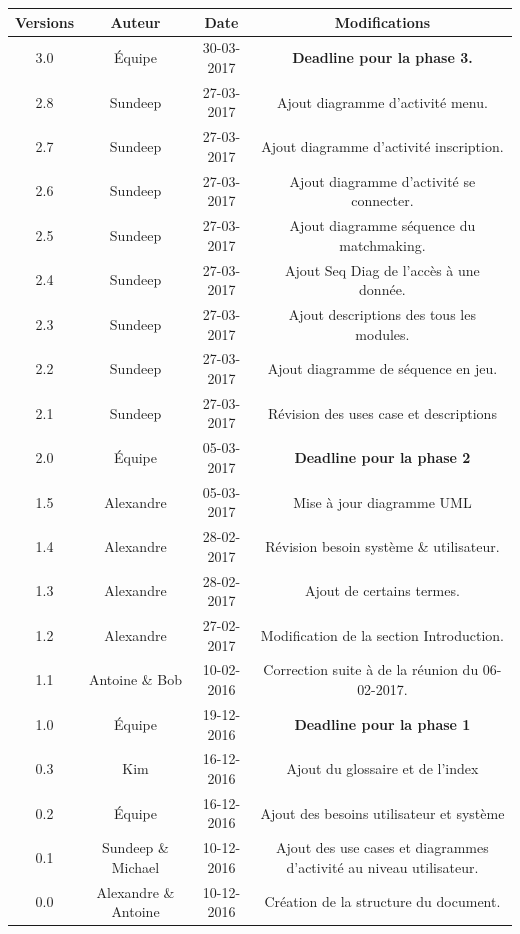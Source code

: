 \documentclass[12pt,a4paper]{article}
\begin{document}
\begin{center}
\hspace*{0cm}
\begin{tabular}{|c|c|c|c|}
\hline
Versions & Auteur & Date & Modifications \\
\hline
3.0 & Équipe & 30-03-2017 &\textbf{Deadline pour la phase 3.}\\
2.8 & Sundeep & 27-03-2017 & Ajout diagramme d'activité menu.\\
2.7 & Sundeep & 27-03-2017 & Ajout diagramme d'activité inscription. \\
2.6 & Sundeep & 27-03-2017 & Ajout diagramme d'activité se connecter.\\
2.5 & Sundeep & 27-03-2017 & Ajout diagramme séquence du matchmaking.\\
2.4 & Sundeep & 27-03-2017 & Ajout Seq Diag de l'accès à une donnée.\\
2.3 & Sundeep & 27-03-2017 & Ajout descriptions des tous les modules.\\
2.2 & Sundeep & 27-03-2017 & Ajout diagramme de séquence en jeu.\\
2.1 & Sundeep & 27-03-2017 & Révision des uses case et descriptions\\
2.0 & Équipe & 05-03-2017 &\textbf{Deadline pour la phase 2}\\
1.5 & Alexandre & 05-03-2017 & Mise à jour diagramme UML\\
1.4 & Alexandre & 28-02-2017 & Révision besoin système \& utilisateur.\\
1.3 & Alexandre & 28-02-2017 & Ajout de certains termes.\\
1.2 & Alexandre & 27-02-2017 & Modification de la section Introduction.\\
1.1 & Antoine \& Bob & 10-02-2016 & Correction suite à de la réunion du 06-02-2017. \\
1.0 & Équipe & 19-12-2016 & \textbf{Deadline pour la phase 1}\\
0.3 & Kim & 16-12-2016 & Ajout du glossaire et de l'index\\
0.2 & Équipe & 16-12-2016 & Ajout des besoins utilisateur et système\\
0.1 & Sundeep \& Michael & 10-12-2016 & Ajout des use cases et diagrammes d'activité au niveau utilisateur.\\
0.0 & Alexandre \& Antoine & 10-12-2016 & Création de la structure du document.\\
\hline
\end{tabular}
\end{center}
\end{document}
